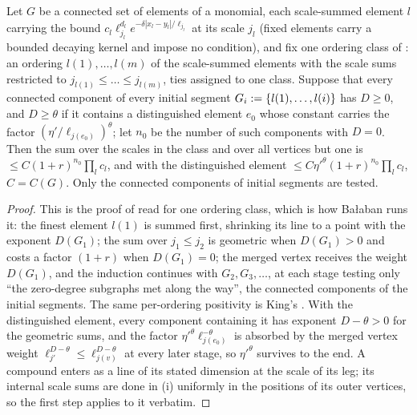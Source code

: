\begin{lemma}\label{rot:h1s:MS}
Let $G$ be a connected set of elements of a monomial, each scale-summed element $l$ carrying the bound $c_l\ell_{j_l}^{d_l}e^{-\delta|x_l-y_l|/\ell_{j_l}}$ at its scale $j_l$ (fixed elements carry a bounded decaying kernel and impose no condition), and fix one ordering class of \cite[(2.7)]{Ba3}: an ordering $l(1),\dots,l(m)$ of the scale-summed elements with the scale sums restricted to $j_{l(1)}\le\dots\le j_{l(m)}$, ties assigned to one class. Suppose that every connected component of every initial segment $G_i:=\{l(1),\dots,l(i)\}$ has $D\ge0$, and $D\ge\theta$ if it contains a distinguished element $e_0$ whose constant carries the factor $(\eta'/\ell_{j(e_0)})^\theta$; let $n_0$ be the number of such components with $D=0$. Then the sum over the scales in the class and over all vertices but one is $\le C(1+r)^{n_0}\prod_lc_l$, and with the distinguished element $\le C\eta'^\theta(1+r)^{n_0}\prod_lc_l$, $C=C(G)$. Only the connected components of initial segments are tested.
\end{lemma}
\begin{proof}
This is the proof of \cite[Prop.~2.1]{Ba3} read for one ordering class, which is how Ba{\l}aban runs it: the finest element $l(1)$ is summed first, shrinking its line to a point with the exponent $D(G_1)$; the sum over $j_1\le j_2$ is geometric when $D(G_1)>0$ and costs a factor $(1+r)$ when $D(G_1)=0$; the merged vertex receives the weight $D(G_1)$, and the induction continues with $G_2,G_3,\dots$, at each stage testing only ``the zero-degree subgraphs met along the way'', the connected components of the initial segments. The same per-ordering positivity is King's \cite[p.~665]{K1}. With the distinguished element, every component containing it has exponent $D-\theta>0$ for the geometric sums, and the factor $\eta'^\theta\ell_{j(e_0)}^{-\theta}$ is absorbed by the merged vertex weight $\ell_{j'}^{D-\theta}\le\ell_{j(v)}^{D-\theta}$ at every later stage, so $\eta'^\theta$ survives to the end. A compound enters as a line of its stated dimension at the scale of its leg; its internal scale sums are done in (i) uniformly in the positions of its outer vertices, so the first step applies to it verbatim.
\end{proof}


